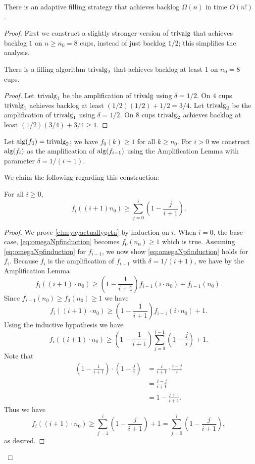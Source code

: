 \begin{proposition}
  \label{prop:factorialTimeAlg}
  There is an adaptive filling strategy that
  achieves backlog $\Omega(n)$ in time $O(n!)$.
\end{proposition}
\begin{proof}
  First we construct a slightly stronger version of $\operatorname{\text{\textup{trivalg}}}$
  that achieves backlog $1$ on $n \ge n_0=8$ cups, instead of
  just backlog $1/2$; this simplifies the analysis.
  \begin{clm}
    There is a filling algorithm $\operatorname{\text{\textup{trivalg}}}_2$ that achieves
    backlog at least $1$ on $n_0 = 8$ cups.
  \end{clm}
  \begin{proof}
    Let $\operatorname{\text{\textup{trivalg}}}_1$ be the amplification of $\operatorname{\text{\textup{trivalg}}}$ using
    $\delta = 1/2$. On $4$ cups $\operatorname{\text{\textup{trivalg}}}_1$ achieves backlog at
    least $(1/2)(1/2)+1/2 = 3/4$.
    Let $\operatorname{\text{\textup{trivalg}}}_2$ be the amplification of $\operatorname{\text{\textup{trivalg}}}_1$ using
    $\delta = 1/2$. On $8$ cups $\operatorname{\text{\textup{trivalg}}}_2$ achieves backlog at
    least $(1/2)(3/4) + 3/4 \ge 1$.
  \end{proof}

  Let $\operatorname{\text{\textup{alg}}}(f_0)=\operatorname{\text{\textup{trivalg}}}_2$; we have $f_0(k) \ge 1$ for all $k
  \ge n_0$. For $i > 0$ we construct $\operatorname{\text{\textup{alg}}}(f_{i})$ as the
  amplification of $\operatorname{\text{\textup{alg}}}(f_{i-1})$ using the Amplification Lemma
  with parameter $\delta = 1/(i+1)$. 

  We claim the following regarding this construction:
  \begin{clm}
    \label{clm:yayactuallygetn}
  For all $i\ge 0$,
  \begin{equation}
    \label{eq:omegaNpfinduction}
    f_i((i+1)n_0) \ge \sum_{j=0}^i \left(1-\frac{j}{i+1}\right).
  \end{equation}
  \end{clm}
  \begin{proof}
  We prove \cref{clm:yayactuallygetn} by induction on $i$. When
  $i=0$, the base case, \eqref{eq:omegaNpfinduction} becomes
  $f_{0}(n_0) \ge 1$ which is true. Assuming
  \eqref{eq:omegaNpfinduction} for $f_{i-1}$, we now show
  \eqref{eq:omegaNpfinduction} holds for $f_{i}$.
  Because $f_{i}$ is the amplification of $f_{i-1}$ with $\delta = 1/(i+1)$, we have by the Amplification Lemma
  $$f_{i}((i+1)\cdot n_0) \ge \left(1 - \frac{1}{i+1}\right) f_{i-1}(i\cdot n_0) + f_{i-1}(n_0).$$
  Since $f_{i-1}(n_0) \ge f_0(n_0) \ge 1$ we have
  $$f_{i}((i+1)\cdot n_0) \ge \left(1 - \frac{1}{i+1}\right) f_{i-1}(i\cdot n_0) + 1.$$
  Using the inductive hypothesis we have
  $$f_{i}((i+1)\cdot n_0) \ge \left(1 - \frac{1}{i+1}\right)\sum_{j=0}^{i-1} \left(1-\frac{j}{i}\right) + 1.$$
  Note that 
  \begin{align*}
    \left(1 - \frac{1}{i+1}\right)\cdot \left(1-\frac{j}{i}\right) &= \frac{i}{i+1} \cdot \frac{i-j}{i} \\
  &= \frac{i-j}{i+1}\\
  &= 1 - \frac{j+1}{i+1}.
  \end{align*}
  Thus we have
  $$f_{i}((i+1)\cdot n_0) \ge \sum_{j=1}^{i} \left(1-\frac{j}{i+1}\right) + 1 = \sum_{j=0}^{i} \left(1-\frac{j}{i+1}\right),$$
  as desired.
  \end{proof}


\end{proof}
